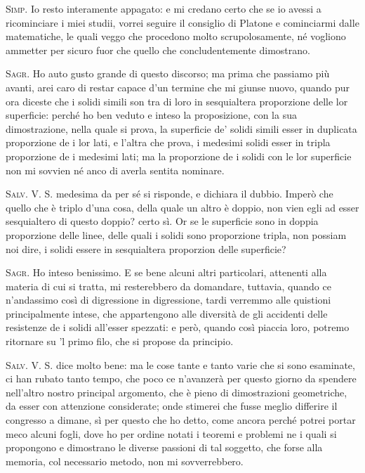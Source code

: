 \documentclass[11pt,twoside,openany]{book}
\newcommand{\speaker}[1]{\textcolor{rubric}{\textsc{#1}}\space}
\begin{document}
\speaker{Simp.} Io resto interamente appagato: e mi credano certo che se io avessi a ricominciare i miei studii, vorrei seguire il consiglio di Platone e cominciarmi dalle matematiche, le quali veggo che procedono molto scrupolosamente, né vogliono ammetter per sicuro fuor che quello che concludentemente dimostrano.

\speaker{Sagr.} Ho auto gusto grande di questo discorso; ma prima che passiamo più avanti, arei caro di restar capace d'un termine che mi giunse nuovo, quando pur ora diceste che i solidi simili son tra di loro in sesquialtera proporzione delle lor superficie: perché ho ben veduto e inteso la proposizione, con la sua dimostrazione, nella quale si prova, la superficie de' solidi simili esser in duplicata proporzione de i lor lati, e l'altra che prova, i medesimi solidi esser in tripla proporzione de i medesimi lati; ma la proporzione de i solidi con le lor superficie non mi sovvien né anco di averla sentita nominare.

\speaker{Salv.} V. S. medesima da per sé si risponde, e dichiara il dubbio. Imperò che quello che è triplo d'una cosa, della quale un altro è doppio, non vien egli ad esser sesquialtero di questo doppio? certo sì. Or se le superficie sono in doppia proporzione delle linee, delle quali i solidi sono proporzione tripla, non possiam noi dire, i solidi essere in sesquialtera proporzion delle superficie?

\speaker{Sagr.} Ho inteso benissimo. E se bene alcuni altri particolari, attenenti alla materia di cui si tratta, mi resterebbero da domandare, tuttavia, quando ce n'andassimo così di digressione in digressione, tardi verremmo alle quistioni principalmente intese, che appartengono alle diversità de gli accidenti delle resistenze de i solidi all'esser spezzati: e però, quando così piaccia loro, potremo ritornare su 'l primo filo, che si propose da principio.

\speaker{Salv.} V. S. dice molto bene: ma le cose tante e tanto varie che si sono esaminate, ci han rubato tanto tempo, che poco ce n'avanzerà per questo giorno da spendere nell'altro nostro principal argomento, che è pieno di dimostrazioni geometriche, da esser con attenzione considerate; onde stimerei che fusse meglio differire il congresso a dimane, sì per questo che ho detto, come ancora perché potrei portar meco alcuni fogli, dove ho per ordine notati i teoremi e problemi ne i quali si propongono e dimostrano le diverse passioni di tal soggetto, che forse alla memoria, col necessario metodo, non mi sovverrebbero.
\end{document}
